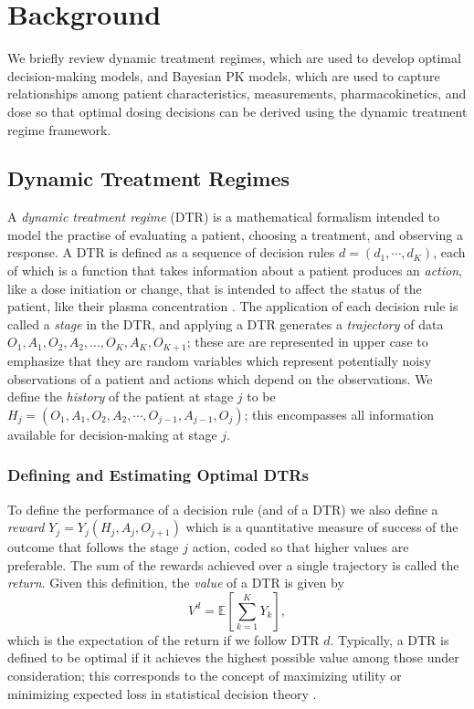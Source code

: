 \section{Background}\label{ss:background}

We briefly review dynamic treatment regimes, which are used to develop optimal decision-making models, and Bayesian PK models, which are used to capture relationships among patient characteristics, measurements, pharmacokinetics, and dose so that optimal dosing decisions can be derived using the dynamic treatment regime framework.

\subsection{Dynamic Treatment Regimes}

A \textit{dynamic treatment regime} (DTR) is a mathematical formalism intended to model the practise of evaluating a patient, choosing a treatment, and observing a response. A DTR is defined as a sequence of decision rules $d = (d_1, \cdots, d_K)$, each of which is a function that takes information about a patient produces an \textit{action}, like a dose initiation or change, that is intended to affect the status of the patient, like their plasma concentration \cite{chakraborty2013statistical,lizotte17reinforcement,tsiatis2019dynamic}. The application of each decision rule is called a \textit{stage} in the DTR, and applying a DTR generates a \textit{trajectory} of data $O_1, A_1, O_2, A_2, ..., O_K, A_K, O_{K+1}$; these are are represented in upper case to emphasize that they are random variables which represent potentially noisy observations of a patient and actions which depend on the observations. We define the \textit{history} of the patient at stage $j$ to be $ H_j = (O_1, A_1, O_2, A_2, \cdots , O_{j-1}, A_{j-1}, O_j)$; this encompasses all information available for decision-making at stage $j$. 

\subsubsection{Defining and Estimating Optimal DTRs}

To define the performance of a decision rule (and of a DTR) we also define a \textit{reward} $ Y_j = Y_j(H_j, A_j, O_{j+1})$ which is a quantitative measure of success of the outcome that follows the stage $j$ action, coded so that higher values are preferable. The sum of the rewards achieved over a single trajectory is called the \textit{return}.  Given this definition, the \textit{value} of a DTR is given by
\begin{equation}
	V^d = \mathbb{E}\left[ \sum_{k=1}^K Y_k \right],
\end{equation}
which is the expectation of the return if we follow DTR $d$. Typically, a DTR is defined to be optimal if it achieves the highest possible value among those under consideration; this corresponds to the concept of maximizing utility or minimizing expected loss in statistical decision theory \cite{berger2013statistical}.

